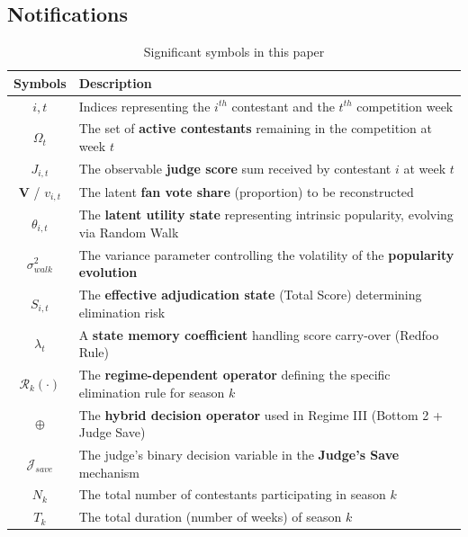 \documentclass{mcmthesis}
\begin{document}
\subsection{Notifications} 
\vspace{-0.5cm}
\begin{table}[h]
	\caption{Significant symbols in this paper} \vspace{-9mm}
	\begin{center}
		\begin{tabular}{cl}
			\toprule[1.5pt]
			\textbf{Symbols} & \textbf{Description} \\
			\midrule[0.6pt]
			$i, t$ & Indices representing the $i^{th}$ contestant and the $t^{th}$ competition week\\
			$\Omega_t$ & The set of \textbf{active contestants} remaining in the competition at week $t$\\
			$J_{i,t}$ & The observable \textbf{judge score} sum received by contestant $i$ at week $t$\\
			$\mathbf{V}$ / $v_{i,t}$ & The latent \textbf{fan vote share} (proportion) to be reconstructed\\
			$\theta_{i,t}$ & The \textbf{latent utility state} representing intrinsic popularity, evolving via Random Walk\\
			$\sigma^2_{walk}$ & The variance parameter controlling the volatility of the \textbf{popularity evolution}\\
			$S_{i,t}$ & The \textbf{effective adjudication state} (Total Score) determining elimination risk\\
			$\lambda_t$ & A \textbf{state memory coefficient} handling score carry-over (Redfoo Rule)\\
			$\mathcal{R}_k(\cdot)$ & The \textbf{regime-dependent operator} defining the specific elimination rule for season $k$\\
			$\oplus$ & The \textbf{hybrid decision operator} used in Regime III (Bottom 2 + Judge Save)\\
			$\mathcal{J}_{save}$ & The judge's binary decision variable in the \textbf{Judge's Save} mechanism\\
			$N_k$ & The total number of contestants participating in season $k$ \\
			$T_k$ & The total duration (number of weeks) of season $k$ \\
			\bottomrule[1.5pt]
		\end{tabular}
	\end{center}
	\label{tab:symbol_description}
\end{table}
\vspace{-0.8cm}
\end{document}
